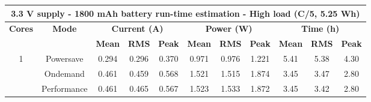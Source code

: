 \begin{table}[H]
\centering
\begin{tabular}{ccccccccccc}
\multicolumn{11}{c}{\textbf{3.3 V supply - 1800 mAh battery run-time estimation - High load (C/5, 5.25 Wh)}}                                                                                                                                                                                                                                                                              \\ \hline
\textbf{Cores}         & \textbf{Mode}                    & \multicolumn{3}{c}{\textbf{Current (A)}}                                                                  & \multicolumn{3}{c}{\textbf{Power (W)}}                                                                    & \multicolumn{3}{c}{\textbf{Time (h)}}                                                                 \\ \hline
\textbf{}              & \textbf{}                        & \textbf{Mean}             & \textbf{RMS}              & \textbf{Peak}                                     & \textbf{Mean}             & \textbf{RMS}              & \textbf{Peak}                                     & \textbf{Mean}            & \textbf{RMS}             & \textbf{Peak}                                   \\ \cline{3-11} 
\multicolumn{1}{c|}{1} & Powersave                        & 0.294                     & 0.296                     & \multicolumn{1}{c|}{{\color[HTML]{FE0000} 0.370}} & 0.971                     & 0.976                     & \multicolumn{1}{c|}{{\color[HTML]{FE0000} 1.221}} & 5.41                     & 5.38                     & {\color[HTML]{FE0000} 4.30}                     \\
\multicolumn{1}{c|}{}  & Ondemand                         & 0.461                     & 0.459                     & \multicolumn{1}{c|}{{\color[HTML]{FE0000} 0.568}} & 1.521                     & 1.515                     & \multicolumn{1}{c|}{{\color[HTML]{FE0000} 1.874}} & 3.45                     & 3.47                     & {\color[HTML]{FE0000} 2.80}                     \\
\multicolumn{1}{c|}{}  & Performance                      & 0.461                     & 0.465                     & \multicolumn{1}{c|}{{\color[HTML]{FE0000} 0.567}} & 1.523                     & 1.533                     & \multicolumn{1}{c|}{{\color[HTML]{FE0000} 1.872}} & 3.45                     & 3.42                     & {\color[HTML]{FE0000} 2.80}                     \\

\end{tabular}
\end{table}
